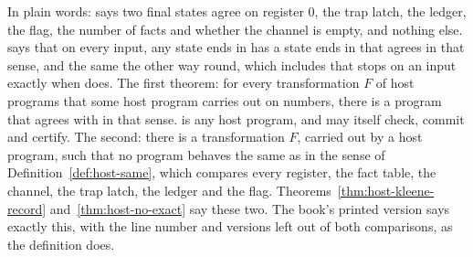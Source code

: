 In plain words:  says two final states agree on register 0, the trap latch, the
ledger, the flag, the number of facts and whether the channel is empty, and nothing else.
 says that on every input, any state  ends in has a state 
ends in that agrees in that sense, and the same the other way round, which includes that 
stops on an input exactly when  does. The first theorem: for every transformation $F$
of host programs that some host program  carries out on numbers, there is a program 
that agrees with  in that sense.  is any host program, and may itself check, commit
and certify. The second: there is a transformation $F$, carried out by a host program, such that
no program  behaves the same as  in the sense of Definition~\ref{def:host-same}, which
compares every register, the fact table, the channel, the trap latch, the ledger and the flag.
Theorems~\ref{thm:host-kleene-record} and~\ref{thm:host-no-exact} say these two. The book's printed
version says exactly this, with the line number and versions left out of both comparisons, as the
definition does.

